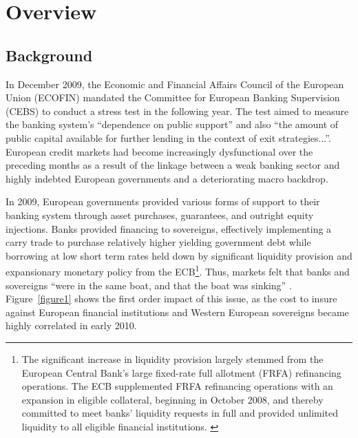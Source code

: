 \documentclass[12pt]{article}
\begin{document}
\section{Overview}

\subsection{Background}

In December 2009, the Economic and Financial Affairs Council of the European Union (ECOFIN) mandated the Committee for European Banking Supervision (CEBS) to conduct a stress test in the following year. The test aimed to measure the banking system's ``dependence on public support'' and also ``the amount of public capital available for further lending in the context of exit strategies...''\citep{CEBS2009}. European credit markets had become increasingly dysfunctional over the preceding months as a result of the linkage between a weak banking sector and highly indebted European governments and a deteriorating macro backdrop.

In 2009, European governments provided various forms of support to their banking system through asset purchases, guarantees, and outright equity injections. Banks provided financing to sovereigns, effectively implementing a carry trade to purchase relatively higher yielding government debt while borrowing at low short term rates held down by significant liquidity provision and expansionary monetary policy from the ECB\footnote{The significant increase in liquidity provision largely stemmed from the European Central Bank's large fixed-rate full allotment (FRFA) refinancing operations. The ECB supplemented FRFA refinancing operations with an expansion in eligible collateral, beginning in October 2008, and thereby committed to meet banks' liquidity requests in full and provided unlimited liquidity to all eligible financial institutions. \citep{RossWiggins}}. Thus, markets felt that banks and sovereigns ``were in the same boat, and that the boat was sinking'' \citep{Sunderji}. Figure~\ref{figure1} shows the first order impact of this issue, as the cost to insure against European financial institutions and Western European sovereigns became highly correlated in early 2010.
\end{document}
